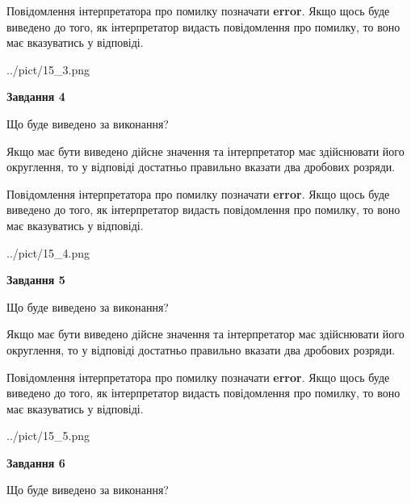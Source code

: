 \documentclass[12pt, ukrainian]{article}
\begin{document}
{\begin {Large}
Повідомлення інтерпретатора про помилку позначати \textbf{error}.
Якщо щось буде виведено до того, як інтерпретатор видасть повідомлення про помилку, 
то воно має вказуватись у відповіді. \par

\begin{center}
	{../pict/15_3.png}
\end{center}
\newpage

{\begin {center}\textbf{Завдання 4}\end {center}}\par
Що буде виведено за виконання? \par

Якщо має бути виведено дійсне значення та інтерпретатор має здійснювати його округлення, 
то у відповіді достатньо правильно вказати два дробових розряди.

Повідомлення інтерпретатора про помилку позначати \textbf{error}.
Якщо щось буде виведено до того, як інтерпретатор видасть повідомлення про помилку, 
то воно має вказуватись у відповіді. \par

\begin{center}
	{../pict/15_4.png}
\end{center}
\newpage

{\begin {center}\textbf{Завдання 5}\end {center}}\par
Що буде виведено за виконання? \par

Якщо має бути виведено дійсне значення та інтерпретатор має здійснювати його округлення, 
то у відповіді достатньо правильно вказати два дробових розряди.

Повідомлення інтерпретатора про помилку позначати \textbf{error}.
Якщо щось буде виведено до того, як інтерпретатор видасть повідомлення про помилку, 
то воно має вказуватись у відповіді. \par

\begin{center}
	{../pict/15_5.png}
\end{center}
\newpage

{\begin {center}\textbf{Завдання 6}\end {center}}\par
Що буде виведено за виконання? \par


\end{Large}}
\end{document}
